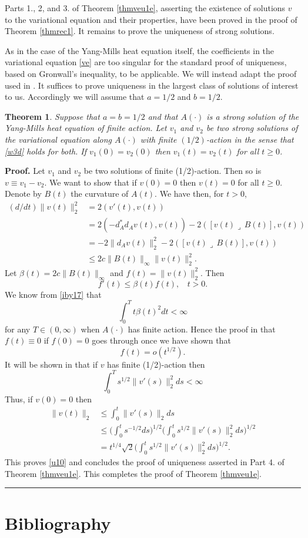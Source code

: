 \documentclass[12pt]{article}
\newtheorem{theorem}{Theorem}[section]
\newenvironment{proof}[1][Proof]{\textbf{#1.} }{\ \rule{0.5em}{0.5em}}
\def \beq{\begin{equation}}
\def \eeq{\end{equation}}
\def \eref{\eqref}
\def \lrc{\lrcorner\,}
\numberwithin{equation}{section}
\begin{document}
Parts 1., 2, and 3. of Theorem \ref{thmveu1e}, asserting the existence of solutions $v$ to the variational equation and their properties, have been proved in the proof of Theorem  \ref{thmrec1}. 
 It remains to prove the uniqueness of strong solutions.
 
 
\bigskip
\noindent
As in the  case of the Yang-Mills heat equation itself, the coefficients
in the variational equation \eref{ve} are too singular for the standard proof of uniqueness,
based on Gronwall's inequality, to be applicable. We will instead adapt the proof
used in \cite{G70}. 
     It suffices to prove uniqueness in the largest class of solutions
 of interest to us.  Accordingly we will assume that $a = 1/2$ and $b = 1/2$. 
 
 \begin{theorem}
 Suppose that $a = b = 1/2$ and that $A(\cdot)$ is a strong solution of the Yang-Mills heat equation
 of finite action. Let $v_1$ and $v_2$ be two strong solutions of the variational equation along $A(\cdot)$
 with finite $(1/2)$-action in the sense that \eref{w3d} holds for both.
 If $v_1(0) = v_2(0)$ then $ v_1(t) = v_2(t)$ for all $t \ge 0$.
 \end{theorem}
                \begin{proof}
 Let $v_1$ and $v_2$ be two solutions of finite (1/2)-action. Then
so is $v \equiv v_1 - v_2$. We want to show that if $v(0) = 0$ then $v(t) =0$ for all $t \ge 0$.
Denote by $B(t)$ the curvature of $A(t)$.
We have then, for $t>0$, 
\begin{align*}
(d/dt) \|v(t)\|_2^2 &= 2 (v'(t), v(t)) \\
&=2( -d_A^* d_Av(t), v(t)) -2 ([v(t)\lrc B(t)], v(t)) \\
&= -2 \| d_{A} v(t)\|_2^2 - 2 ([v(t)\lrc B(t)], v(t)) \\
&\le 2 c \|B(t)\|_\infty \|v(t)\|_2^2.
\end{align*}
Let $\beta(t) = 2c\|B(t)\|_\infty$ and $ f(t) = \| v(t)\|_2^2$. Then 
\beq
f'(t) \le \beta(t) f(t), \ \ \ \ t >0.
\eeq
We know from \eref{iby17}    
that
\beq
\int_0^T t \beta(t)^2 dt < \infty
\eeq
for any $T \in (0, \infty)$ when $A(\cdot)$ has finite action.
Hence the proof in \cite[Theorem (7.20)]{G70} %
 that $ f(t) \equiv 0$ if $f(0) = 0$ goes through once we have shown 
that 
\beq
f(t) = o(t^{1/2}).       \label{u10}
\eeq
It will be shown in  \cite[Theorem 5.5]{G72} 
that if $v$ has finite (1/2)-action then 
\beq
\int_0^T s^{1/2} \|v'(s)\|_2^2 ds < \infty         \label{u12}
\eeq
Thus, if $v(0) = 0$ then 
\begin{align*}
\|v(t)\|_2 &\le \int_0^t \|v'(s)\|_2 ds \\
&\le \Big(\int_0^t s^{-1/2} ds \Big)^{1/2} 
\Big( \int_0^t s^{1/2} \|v'(s)\|_2^2 ds \Big)^{1/2} \\
&= t^{1/4} \sqrt{2}\Big( \int_0^t s^{1/2} \|v'(s)\|_2^2 ds \Big)^{1/2}.
\end{align*}
This proves \eref{u10} and concludes the proof of uniqueness asserted in Part 4. of
Theorem  \ref{thmveu1e}.      
 This completes the proof of Theorem \ref{thmveu1e}.
\end{proof}





\section{Bibliography}



\end{document}
